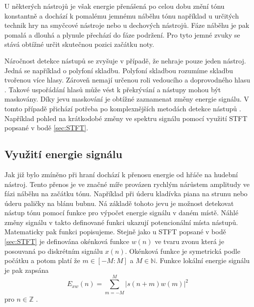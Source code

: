 U některých nástrojů je však energie přenášená po celou dobu znění tónu konstantně a dochází k pomalému jemnému náběhu tónu například u určitých technik hry na smyčcové nástroje nebo u dechových nástrojů. Fáze náběhu je pak pomalá a dlouhá a plynule přechází do fáze podržení. Pro tyto jemné zvuky se stává obtížné určit skutečnou pozici začátku noty.




Náročnost detekce nástupů se zvyšuje v případě, že nehraje pouze jeden nástroj. Jedná se například o polyfoní skladbu. Polyfoní skladbou rozumíme skladbu tvořenou více hlasy.
Zároveň nemají určenou roli vedoucího a doprovodného hlasu \cite{6155601}.
Takové uspořádání hlasů může vést k překrývání a nástupy mohou být maskovány. Díky jevu maskování je obtížné zaznamenat změny energie signálu. V tomto případě přichází potřeba po komplexnějších metodách detekce nástupů \cite{fundamental_of_music_processing}. Například pohled na krátkodobé změny ve spektru signálu pomocí využití \acs{STFT} popsané v bodě \ref{sec:STFT}.

  \subsection{Využití energie signálu} \label{sec:Energie_signalu}

  Jak již bylo zmíněno při hraní dochází k přenosu energie od hřáče na hudební nástroj.
  Tento přenos je ve značné míře provázen rychlým nárůstem amplitudy ve fázi náběhu na začátku tónu.
  Například při úderu kladívka piana na strunu nebo úderu paličky na blánu bubnu.
  Ná základě tohoto jevu je možnost detekovat nástup tónu pomocí funkce pro výpočet energie signálu v daném místě.
  Náhlé změny signálu v takto definované funkci ukazují potencionální místa nástupů.
  Matematicky pak funkci popisujeme. 
  Stejně jako u \acs{STFT} popsané v bodě \ref{sec:STFT} je definována okénková funkce $w(n)$ ve tvaru zvonu  která je posouvaná po diskrétním signálu $x(n)$.
  Okénková funkce je symetrická podle počátku a potom platí že $ m \in [-M : M]$ a $M \in \mathbb{N}$. Funkce lokální energie signálu je pak zapsána
  \begin{equation}
    E_{xw}(n) = \sum_{m = -M}^{M} |s(n+m)w(m)|^2
  \end{equation}
  pro $n \in \mathbb{Z}$ \cite{fundamental_of_music_processing}.

